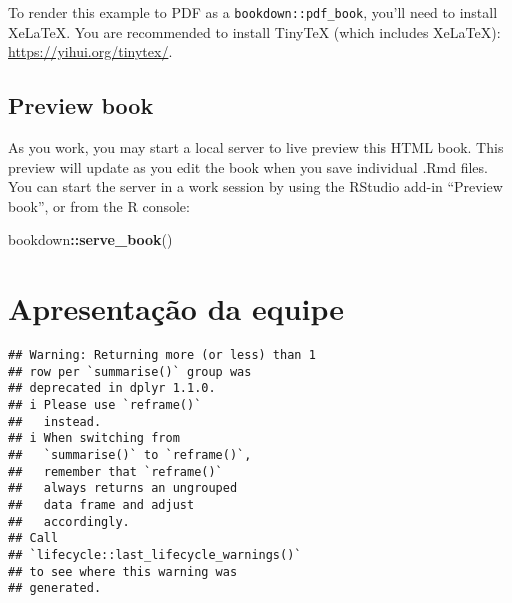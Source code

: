 \documentclass[
]{book}
\newenvironment{Shaded}{\begin{snugshade}}{\end{snugshade}}
\newcommand{\FunctionTok}[1]{\textcolor[rgb]{0.13,0.29,0.53}{\textbf{#1}}}
\newcommand{\NormalTok}[1]{#1}
\newcommand{\SpecialCharTok}[1]{\textcolor[rgb]{0.81,0.36,0.00}{\textbf{#1}}}
\begin{document}
To render this example to PDF as a \texttt{bookdown::pdf\_book}, you'll need to install XeLaTeX. You are recommended to install TinyTeX (which includes XeLaTeX): \url{https://yihui.org/tinytex/}.

\section{Preview book}\label{preview-book}

As you work, you may start a local server to live preview this HTML book. This preview will update as you edit the book when you save individual .Rmd files. You can start the server in a work session by using the RStudio add-in ``Preview book'', or from the R console:

\begin{Shaded}
\begin{Highlighting}[]
\NormalTok{bookdown}\SpecialCharTok{::}\FunctionTok{serve\_book}\NormalTok{()}
\end{Highlighting}
\end{Shaded}

\chapter{Apresentação da equipe}\label{apresentauxe7uxe3o-da-equipe}

\begin{verbatim}
## Warning: Returning more (or less) than 1
## row per `summarise()` group was
## deprecated in dplyr 1.1.0.
## i Please use `reframe()`
##   instead.
## i When switching from
##   `summarise()` to `reframe()`,
##   remember that `reframe()`
##   always returns an ungrouped
##   data frame and adjust
##   accordingly.
## Call
## `lifecycle::last_lifecycle_warnings()`
## to see where this warning was
## generated.
\end{verbatim}
\end{document}
